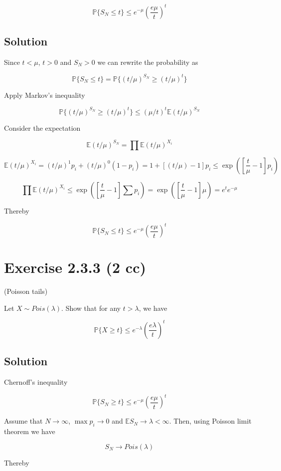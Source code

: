\documentclass{article}
\begin{document}
$$\mathbb P\{S_N \leq t\} \leq e^{-\mu}\left(\frac{e\mu}{t}\right)^t$$

\subsection{Solution}

Since $t<\mu$, $t>0$ and $S_N>0$ we can rewrite the probability as

$$\mathbb P\{S_N \leq t\} = \mathbb P\{(t/\mu)^{S_N} \geq (t/\mu)^t\}$$

Apply Markov's inequality

$$\mathbb P\{(t/\mu)^{S_N} \geq (t/\mu)^t\} \leq (\mu/t)^t\mathbb E (t/\mu)^{S_N}$$

Consider the expectation

$$\mathbb E (t/\mu)^{S_N} = \prod \mathbb E (t/\mu)^{X_i}$$

$$\mathbb E (t/\mu)^{X_i} = (t/\mu)^1p_i + (t/\mu)^0(1-p_i) = 1 + [(t/\mu) - 1]p_i \leq \exp \left(\left[\frac{t}{\mu}-1\right]p_i\right)$$

$$\prod \mathbb E (t/\mu)^{X_i} \leq \exp \left(\left[\frac{t}{\mu}-1\right]\sum p_i\right) = \exp \left(\left[\frac{t}{\mu}-1\right]\mu \right) = e^te^{-\mu}$$

Thereby

$$\mathbb P\{S_N \leq t\} \leq e^{-\mu}\left(\frac{e\mu}{t}\right)^t$$

\section{Exercise 2.3.3 (2 cc)}
(Poisson tails)

Let $X \sim Pois(\lambda)$. Show that for any $t > \lambda$, we have

$$\mathbb P\{X \geq t\} \leq e^{-\lambda}\left(\frac{e\lambda}{t}\right)^t$$

\subsection{Solution}

Chernoff’s inequality

$$\mathbb P\{S_N \geq t\} \leq e^{-\mu}\left(\frac{e\mu}{t}\right)^t$$

Assume that $N \to \infty$, $\max p_i \to 0$ and $\mathbb E S_N \to \lambda < \infty$. Then, using Poisson limit theorem we have

$$S_N \to Pois(\lambda)$$

Thereby
\end{document}

